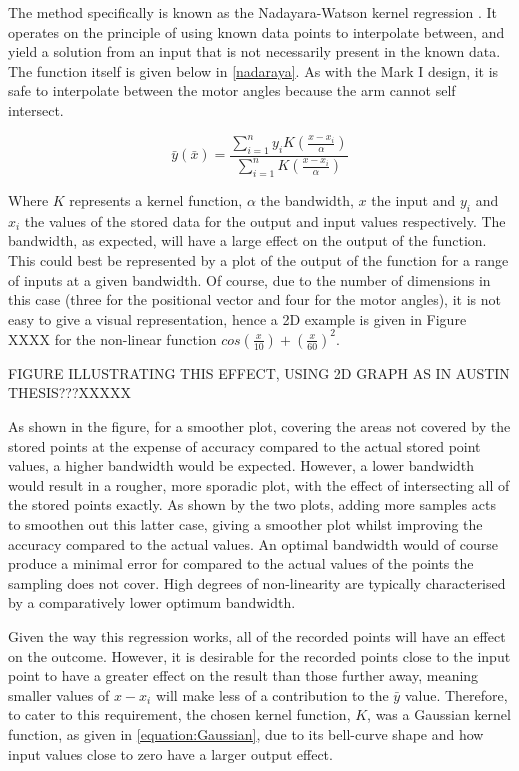 \documentclass[11pt]{article}
\begin{document}
The method specifically is known as the Nadayara-Watson kernel regression \cite{nadaraya1964}. It operates on the principle of using known data points to interpolate between, and yield a solution from an input that is not necessarily present in the known data. The function itself is given below in \eqref{nadaraya}. As with the Mark I design, it is safe to interpolate between the motor angles because the arm cannot self intersect.

\begin{equation}\label{nadaraya}
\bar{y}(\bar{x}) = \frac{\sum_{i=1}^{n}y_{i}K(\frac{x - x_{i}}{\alpha})}{\sum_{i=1}^{n}K(\frac{x - x_{i}}{\alpha})}
\end{equation}

Where $K$ represents a kernel function, $\alpha$ the bandwidth, $x$ the input and $y_{i}$ and $x_{i}$ the values of the stored data for the output and input values respectively. The bandwidth, as expected, will have a large effect on the output of the function. This could best be represented by a plot of the output of the function for a range of inputs at a given bandwidth. Of course, due to the number of dimensions in this case (three for the positional vector and four for the motor angles), it is not easy to give a visual representation, hence a 2D example is given in Figure XXXX for the non-linear  function $cos(\frac{x}{10}) + (\frac{x}{60})^2$. 

FIGURE ILLUSTRATING THIS EFFECT, USING 2D GRAPH AS IN AUSTIN THESIS???XXXXX

As shown in the figure, for a smoother plot, covering the areas not covered by the stored points at the expense of accuracy compared to the actual stored point values, a higher bandwidth would be expected. However, a lower bandwidth would result in a rougher, more sporadic plot, with the effect of intersecting all of the stored points exactly. As shown by the two plots, adding more samples acts to smoothen out this latter case, giving a smoother plot whilst improving the accuracy compared to the actual values. An optimal bandwidth would of course produce a minimal error for compared to the actual values of the points the sampling does not cover. High degrees of non-linearity are typically characterised by a comparatively lower optimum bandwidth.

Given the way this regression works, all of the recorded points will have an effect on the outcome. However, it is desirable for the recorded points close to the input point to have a greater effect on the result than those further away, meaning smaller values of $x - x_{i}$ will make less of a contribution to the $\bar{y}$ value. Therefore, to cater to this requirement, the chosen kernel function, $K$, was a Gaussian kernel function, as given in \eqref{equation:Gaussian}, due to its bell-curve shape and how input values close to zero have a larger output effect.
\end{document}

